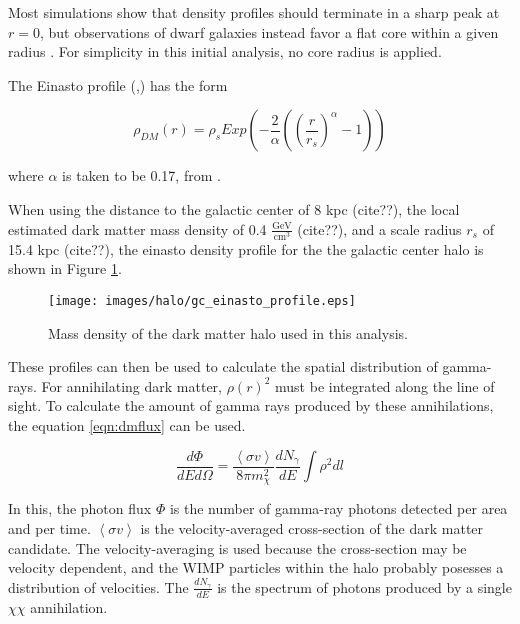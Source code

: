     Most simulations show that density profiles should terminate in a sharp peak at $r=0$, but observations of dwarf galaxies instead favor a flat core within a given radius \cite{CoreVsCusp}.
    For simplicity in this initial analysis, no core radius is applied.

    The Einasto profile (\cite{einastoprofile1},\cite{einastoprofile2}) has the form

    \begin{equation} \label{eqn:einasto}
      \rho_{DM} \left( r \right) = \rho_{s} Exp \left( - \frac{2}{\alpha} \left( {\left( \frac{r}{r_s} \right)}^{\alpha} - 1 \right) \right)
    \end{equation}
    
    where $\alpha$ is taken to be 0.17, from \cite{PieriGalaxySims}.
    
    When using the distance to the galactic center of 8 kpc {\color{red}(cite??)}, the local estimated dark matter mass density of 0.4 $ \frac{ \text{GeV} }{ \text{cm}^3 } $ {\color{red}(cite??)}, and a scale radius $r_s$ of 15.4 kpc {\color{red}(cite??)}, the einasto density profile for the the galactic center halo is shown in Figure \ref{fig:gchalo_density}.
  
    \begin{figure}[ht]
      \centering
      \texttt{[image: images/halo/gc\_einasto\_profile.eps]}
      \caption[Galactic Center Einasto Halo Density]{
        Mass density of the dark matter halo used in this analysis.}
      \label{fig:gchalo_density}
    \end{figure}
    
    These profiles can then be used to calculate the spatial distribution of gamma-rays.
    For annihilating dark matter, $\rho\left(r\right)^2$ must be integrated along the line of sight.
    To calculate the amount of gamma rays produced by these annihilations, the equation \ref{eqn:dmflux} can be used.
    
    \begin{equation}\label{eqn:dmflux}
      \frac{ d\Phi }{ dE d \Omega } = \frac{ \left \langle \sigma v \right \rangle }{8 \pi m_\chi^2} \frac{dN_{\gamma}}{dE} \int \rho^2 dl
    \end{equation}
    
    In this, the photon flux $\Phi$ is the number of gamma-ray photons detected per area and per time.
    $\left \langle \sigma v \right \rangle$ is the velocity-averaged cross-section of the dark matter candidate.
    The velocity-averaging is used because the cross-section may be velocity dependent, and the WIMP particles within the halo probably posesses a distribution of velocities.
    The $\frac{dN_{\gamma}}{dE}$ is the spectrum of photons produced by a single $\chi\chi$ annihilation.
    
